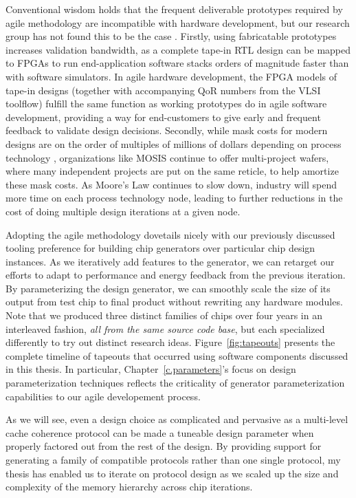 Conventional wisdom holds that the frequent deliverable prototypes required by agile methodology are incompatible with hardware development, but our research group has not found this to be the case \cite{lee-micro15}.
Firstly, using fabricatable prototypes increases validation
bandwidth, as a complete tape-in RTL design can be mapped to FPGAs to run
end-application software stacks orders of magnitude faster than with
software simulators. 
In agile hardware development, the FPGA models
of tape-in designs (together with accompanying QoR
numbers from the VLSI toolflow) fulfill the same function as working
prototypes do in agile software development, providing a way for
end-customers to give early and frequent feedback to validate design decisions.
Secondly, while mask costs for modern designs are on the order of multiples of millions of dollars depending on process technology \cite{sperling}, 
organizations like MOSIS continue to offer multi-project wafers, where many independent projects are put on the same reticle, to help amortize these mask costs.
As Moore's Law continues to slow down, industry will spend more time on each process technology node, leading to further reductions in the cost of doing multiple design iterations
at a given node.

Adopting the agile methodology dovetails nicely with our previously discussed tooling preference for building chip generators over particular chip design instances.
As we iteratively add features to the generator, we can retarget our efforts to adapt to performance and energy feedback from the previous iteration.
By parameterizing the design generator, we can smoothly scale the size of its output from test chip to final product without rewriting any hardware modules.
Note that we produced three distinct families of chips over four years in an interleaved fashion, {\em all from the same source code base}, but each specialized differently to try out distinct research ideas.
Figure~\ref{fig:tapeouts} presents the complete timeline of tapeouts that occurred using software components discussed in this thesis.
In particular, Chapter~\ref{c.parameters}'s focus on design parameterization techniques reflects the criticality of generator parameterization capabilities to our agile developement process.

As we will see, even a design choice as complicated and pervasive as a multi-level cache coherence protocol can be made a tuneable design parameter when properly factored out from the rest of the design.
By providing support for generating a family of compatible protocols rather than one single protocol, my thesis has enabled us to iterate on protocol design as we scaled up the size and complexity of the memory hierarchy across chip iterations.

